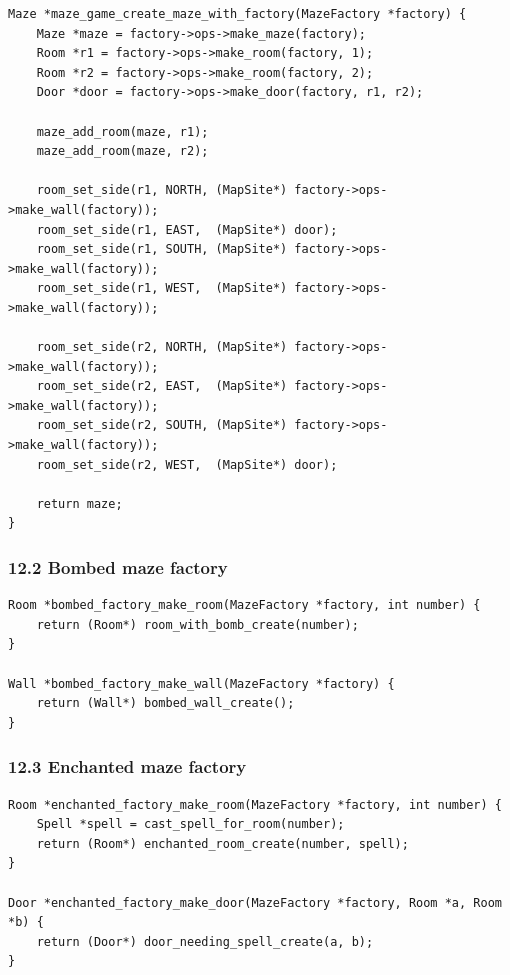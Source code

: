 \documentclass[11pt]{article}
\begin{document}
\begin{verbatim}
Maze *maze_game_create_maze_with_factory(MazeFactory *factory) {
    Maze *maze = factory->ops->make_maze(factory);
    Room *r1 = factory->ops->make_room(factory, 1);
    Room *r2 = factory->ops->make_room(factory, 2);
    Door *door = factory->ops->make_door(factory, r1, r2);

    maze_add_room(maze, r1);
    maze_add_room(maze, r2);

    room_set_side(r1, NORTH, (MapSite*) factory->ops->make_wall(factory));
    room_set_side(r1, EAST,  (MapSite*) door);
    room_set_side(r1, SOUTH, (MapSite*) factory->ops->make_wall(factory));
    room_set_side(r1, WEST,  (MapSite*) factory->ops->make_wall(factory));

    room_set_side(r2, NORTH, (MapSite*) factory->ops->make_wall(factory));
    room_set_side(r2, EAST,  (MapSite*) factory->ops->make_wall(factory));
    room_set_side(r2, SOUTH, (MapSite*) factory->ops->make_wall(factory));
    room_set_side(r2, WEST,  (MapSite*) door);

    return maze;
}
\end{verbatim}

\subsubsection{12.2 Bombed maze factory}\label{bombed-maze-factory}

\begin{verbatim}
Room *bombed_factory_make_room(MazeFactory *factory, int number) {
    return (Room*) room_with_bomb_create(number);
}

Wall *bombed_factory_make_wall(MazeFactory *factory) {
    return (Wall*) bombed_wall_create();
}
\end{verbatim}

\subsubsection{12.3 Enchanted maze factory}\label{enchanted-maze-factory}

\begin{verbatim}
Room *enchanted_factory_make_room(MazeFactory *factory, int number) {
    Spell *spell = cast_spell_for_room(number);
    return (Room*) enchanted_room_create(number, spell);
}

Door *enchanted_factory_make_door(MazeFactory *factory, Room *a, Room *b) {
    return (Door*) door_needing_spell_create(a, b);
}
\end{verbatim}
\end{document}
